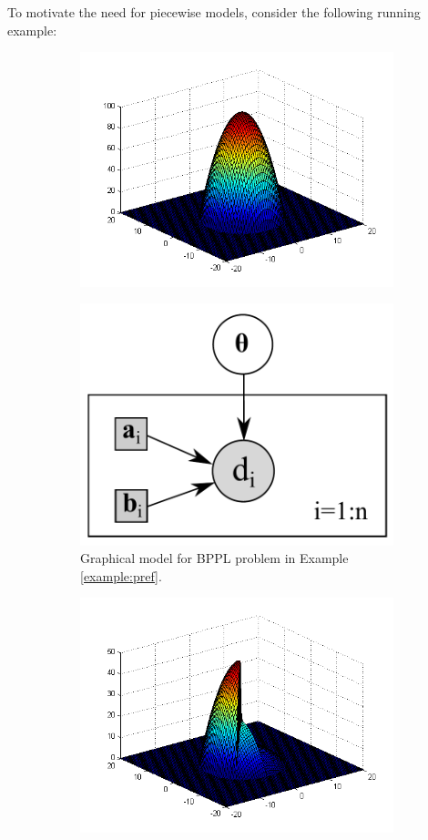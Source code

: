 To motivate the need for piecewise models, consider the following
running example:
\begin{figure}%
\centering
\begin{subfigure}{.2\textwidth}
  \centering
  \includegraphics[width=.99\textwidth]{pic/bpplPriorII.png}
  \label{fig:prior2d}
\end{subfigure}%
\begin{subfigure}{.58\textwidth}
\centering
\includegraphics[width=.24\textwidth]{pic/pref2w.pdf}
\caption{\footnotesize Graphical model for BPPL problem in Example \ref{example:pref}. }
\end{subfigure}
\begin{subfigure}{.2\textwidth}
  \centering
  \includegraphics[width=.99\textwidth]{pic/bpplPosteriorII.png}
  \label{fig:prior2d}
\end{subfigure}%
\label{fig:pref}
\end{figure}
